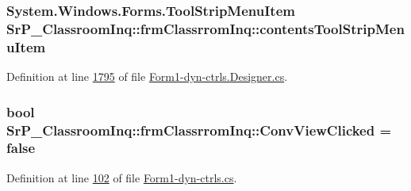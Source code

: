 \hypertarget{class_sr_p___classroom_inq_1_1frm_classrrom_inq_ac8e6b07efe8b6fe7e1a82d326648f88e}{
\subsubsection[{contents\-Tool\-Strip\-Menu\-Item}]{\setlength{\rightskip}{0pt plus 5cm}\-System.\-Windows.\-Forms.\-Tool\-Strip\-Menu\-Item {\bf \-Sr\-P\-\_\-\-Classroom\-Inq\-::frm\-Classrrom\-Inq\-::contents\-Tool\-Strip\-Menu\-Item}}}
\label{class_sr_p___classroom_inq_1_1frm_classrrom_inq_ac8e6b07efe8b6fe7e1a82d326648f88e}


\-Definition at line \hyperlink{_form1-dyn-ctrls_8_designer_8cs_source_l01795}{1795} of file \hyperlink{_form1-dyn-ctrls_8_designer_8cs_source}{\-Form1-\/dyn-\/ctrls.\-Designer.\-cs}.

\hypertarget{class_sr_p___classroom_inq_1_1frm_classrrom_inq_a567cf412a542927bb47984c0e835a7d2}{
\subsubsection[{\-Conv\-View\-Clicked}]{\setlength{\rightskip}{0pt plus 5cm}bool {\bf \-Sr\-P\-\_\-\-Classroom\-Inq\-::frm\-Classrrom\-Inq\-::\-Conv\-View\-Clicked} = false}}
\label{class_sr_p___classroom_inq_1_1frm_classrrom_inq_a567cf412a542927bb47984c0e835a7d2}


\-Definition at line \hyperlink{_form1-dyn-ctrls_8cs_source_l00102}{102} of file \hyperlink{_form1-dyn-ctrls_8cs_source}{\-Form1-\/dyn-\/ctrls.\-cs}.

